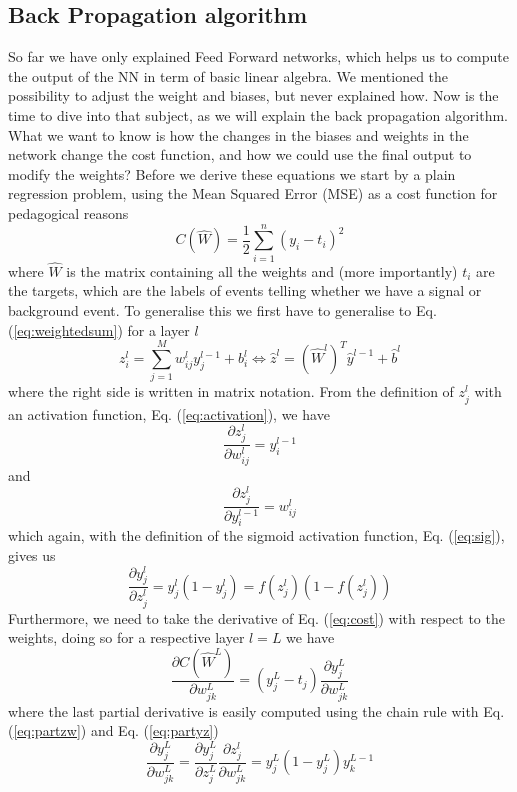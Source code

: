 \documentclass[14pt, a4paper]{book}
\begin{document}
\subsection{Back Propagation algorithm}
So far we have only explained Feed Forward networks, which helps us to compute the output of the NN in term of basic linear algebra. We mentioned the possibility to adjust the weight and biases, but never explained how. 
Now is the time to dive into that subject, as we will explain the back propagation algorithm. What we want to know is how the changes in the biases and weights in the network change the cost function, and how we could use the final 
output to modify the weights? Before we derive these equations we start by a plain regression problem, using the Mean Squared Error (MSE) as a cost function for pedagogical reasons
\begin{equation}\label{eq:cost}
    C(\hat{W})=\frac{1}{2}\sum_{i=1}^n(y_i-t_i)^2
\end{equation}
where $\hat{W}$ is the matrix containing all the weights and (more importantly) $t_i$ are the targets, which are the labels of events telling whether we have a signal or background event. To generalise this we 
first have to generalise to Eq. (\ref{eq:weightedsum}) for a layer $l$
$$
    z_i^l=\sum_{j=1}^Mw^l_{ij}y^{l-1}_j + b^l_i \Leftrightarrow \hat{z}^l=\left(\hat{W}^l\right)^T\hat{y}^{l-1} + \hat{b}^l
$$
where the right side is written in matrix notation. From the definition of $z_j^l$ with an activation function, Eq. (\ref{eq:activation}), we have
\begin{equation}\label{eq:partzw}
    \frac{\partial z_j^l}{\partial w_{ij}^l} = y_i^{l-1}
\end{equation}
and
$$
\frac{\partial z_j^l}{\partial y_i^{l-1}} = w_{ij}^l
$$
which again, with the definition of the sigmoid activation function, Eq. (\ref{eq:sig}), gives us
\begin{equation}\label{eq:partyz}
    \frac{\partial y^l_j}{\partial z_j^{l}} = y_j^l(1-y_j^l)=f(z_j^l)(1-f(z_j^l))
\end{equation}
Furthermore, we need to take the derivative of Eq. (\ref{eq:cost}) with respect to the weights, doing so for a respective layer $l=L$ we have
$$
    \frac{\partial C(\hat W ^L) }{\partial w_{jk}^L}=\left(y_j^L-t_j\right)\frac{\partial y_j^L}{\partial w_{jk}^L}
$$
where the last partial derivative is easily computed using the chain rule with Eq. (\ref{eq:partzw}) and Eq. (\ref{eq:partyz})
$$
\frac{\partial y_j^L}{\partial w_{jk}^L} = \frac{\partial y^L_j}{\partial z_j^{L}}\frac{\partial z_j^l}{\partial w_{jk}^L} = y_j^L(1-y_j^L)y_k^{L-1}
$$
\end{document}
